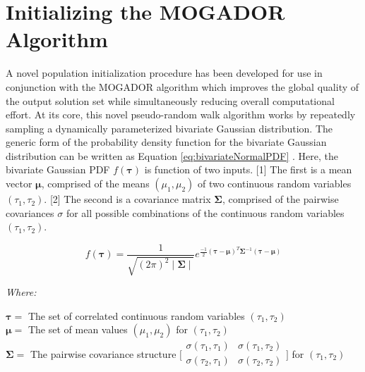 \section{Initializing the MOGADOR Algorithm}
    
A novel population initialization procedure has been developed for use in conjunction with the MOGADOR algorithm which improves the global quality of the output solution set while simultaneously reducing overall computational effort. At its core, this novel pseudo-random walk algorithm works by repeatedly sampling a dynamically parameterized bivariate Gaussian distribution. The generic form of the probability density function for the bivariate Gaussian distribution can be written as Equation \ref{eq:bivariateNormalPDF} \cite{Johnson2002}. Here, the bivariate Gaussian PDF $f(\boldsymbol{\tau})$ is function of two inputs. [1] The first is a mean vector $\boldsymbol{\mu}$, comprised of the means $(\mu_1, \mu_2)$ of two continuous random variables $(\tau_1, \tau_2)$. [2] The second is a covariance matrix $\boldsymbol{\Sigma}$, comprised of the pairwise covariances $\sigma$ for all possible combinations of the continuous random variables $(\tau_1, \tau_2)$.
            
            \begin{equation}
            f(\boldsymbol{\tau}) = \frac{1}{ \sqrt{ (2\pi)^2 \mid \boldsymbol{\Sigma} \mid} } e^{ \frac{-1}{2} ( \boldsymbol{\tau} - \boldsymbol{\mu} )^T \boldsymbol{ \Sigma}^{-1} ( \boldsymbol{\tau} - \boldsymbol{\mu} ) }
            \label{eq:bivariateNormalPDF}
            \end{equation}

            \noindent \textit{Where:} \hfill

            \begin{center}
            $\boldsymbol{\tau} =$ The set of correlated continuous random variables $(\tau_1, \tau_2)$
            \\
            $\boldsymbol{\mu} = $ The set of mean values $(\mu_1, \mu_2)$ for $(\tau_1, \tau_2)$
            \\
            $\boldsymbol{\Sigma} =$ The pairwise covariance structure $\bigl[\begin{smallmatrix} \sigma(\tau_{1},\tau_{1}) & \sigma(\tau_{1},\tau_{2}) \\ \sigma(\tau_{2},\tau_{1}) & \sigma(\tau_{2},\tau_{2}) \\ \end{smallmatrix}\bigr]$ for $(\tau_{1}, \tau_{2})$
            \end{center}
            
